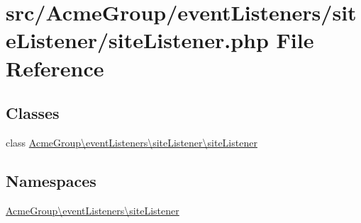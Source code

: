 \hypertarget{site_listener_8php}{\section{src/\+Acme\+Group/event\+Listeners/site\+Listener/site\+Listener.php File Reference}
\label{site_listener_8php}
}
\subsection*{Classes}
\begin{DoxyCompactItemize}
\item 
class \hyperlink{class_acme_group_1_1event_listeners_1_1site_listener_1_1site_listener}{Acme\+Group\textbackslash{}event\+Listeners\textbackslash{}site\+Listener\textbackslash{}site\+Listener}
\end{DoxyCompactItemize}
\subsection*{Namespaces}
\begin{DoxyCompactItemize}
\item 
 \hyperlink{namespace_acme_group_1_1event_listeners_1_1site_listener}{Acme\+Group\textbackslash{}event\+Listeners\textbackslash{}site\+Listener}
\end{DoxyCompactItemize}
